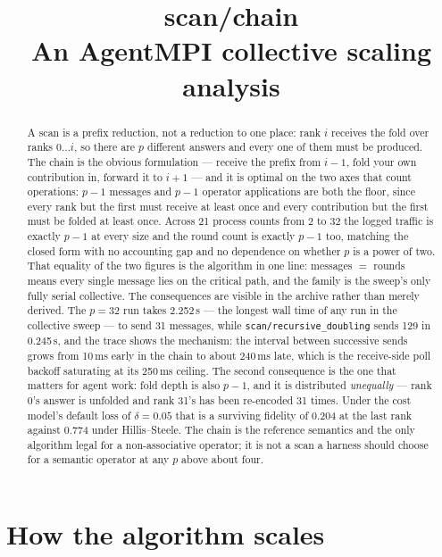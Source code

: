 \documentclass[11pt]{article}
\title{\textbf{scan/chain}\\[2pt]\large An AgentMPI collective scaling analysis}
\author{}
\date{}
\begin{document}
\maketitle

\begin{abstract}
A scan is a prefix reduction, not a reduction to one place: rank $i$ receives the fold over ranks
$0 \ldots i$, so there are $p$ different answers and every one of them must be produced. The chain
is the obvious formulation --- receive the prefix from $i-1$, fold your own contribution in,
forward it to $i+1$ --- and it is optimal on the two axes that count operations: $p-1$ messages
and $p-1$ operator applications are both the floor, since every rank but the first must receive at
least once and every contribution but the first must be folded at least once. Across 21 process
counts from 2 to 32 the logged traffic is exactly $p-1$ at every size and the round count is
exactly $p-1$ too, matching the closed form with no accounting gap and no dependence on whether
$p$ is a power of two. That equality of the two figures is the algorithm in one line: messages
$=$ rounds means every single message lies on the critical path, and the family is the sweep's
only fully serial collective. The consequences are visible in the archive rather than merely
derived. The $p=32$ run takes 2.252\,s --- the longest wall time of any run in the collective
sweep --- to send 31 messages, while \texttt{scan/recursive\_doubling} sends 129 in 0.245\,s, and
the trace shows the mechanism: the interval between successive sends grows from 10\,ms early in
the chain to about 240\,ms late, which is the receive-side poll backoff saturating at its 250\,ms
ceiling. The second consequence is the one that matters for agent work: fold depth is also $p-1$,
and it is distributed \emph{unequally} --- rank 0's answer is unfolded and rank 31's has been
re-encoded 31 times. Under the cost model's default loss of $\delta = 0.05$ that is a surviving
fidelity of 0.204 at the last rank against 0.774 under Hillis--Steele. The chain is the reference
semantics and the only algorithm legal for a non-associative operator; it is not a scan a harness
should choose for a semantic operator at any $p$ above about four.
\end{abstract}



\section{How the algorithm scales}
\end{document}
